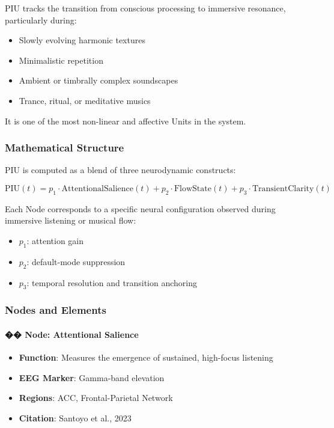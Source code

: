 \documentclass[10pt]{article}
\begin{document}
PIU tracks the transition from conscious processing to immersive resonance, particularly during:

\begin{itemize}
    \item Slowly evolving harmonic textures
    \item Minimalistic repetition
    \item Ambient or timbrally complex soundscapes
    \item Trance, ritual, or meditative musics
\end{itemize}

It is one of the most non-linear and affective Units in the system.

\subsubsection*{Mathematical Structure}

PIU is computed as a blend of three neurodynamic constructs:

\[
\text{PIU}(t) = p_1 \cdot \text{AttentionalSalience}(t) + p_2 \cdot \text{FlowState}(t) + p_3 \cdot \text{TransientClarity}(t)
\]

Each Node corresponds to a specific neural configuration observed during immersive listening or musical flow:

\begin{itemize}
    \item $p_1$: attention gain
    \item $p_2$: default-mode suppression
    \item $p_3$: temporal resolution and transition anchoring
\end{itemize}

\subsubsection*{Nodes and Elements}

\paragraph{�� Node: Attentional Salience}

\begin{itemize}
    \item \textbf{Function}: Measures the emergence of sustained, high-focus listening
    \item \textbf{EEG Marker}: Gamma-band elevation
    \item \textbf{Regions}: ACC, Frontal-Parietal Network
    \item \textbf{Citation}: Santoyo et al., 2023
\end{itemize}
\end{document}
